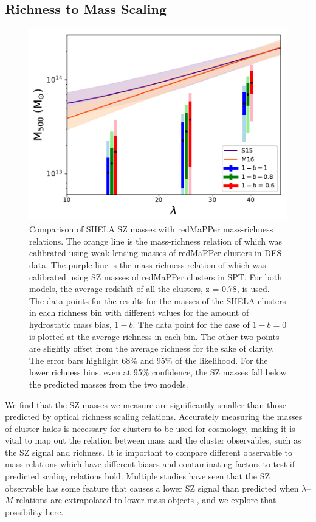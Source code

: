 \documentclass[a4paper,fleqn,usenatbib]{mnras}
\begin{document}
\subsection{Richness to Mass Scaling}
\begin{figure}
  \centering
    \includegraphics[width=\columnwidth] {M500_lambda_shela_sptvsrm.pdf}
  \caption{Comparison of SHELA SZ masses with redMaPPer mass-richness relations. The orange line is the mass-richness relation of \protect \cite{2016arXiv161006890M} which was calibrated using weak-lensing masses of redMaPPer clusters in DES data. The purple line is the mass-richness relation of \protect \cite{2015MNRAS.454.2305S} which was calibrated using SZ masses of redMaPPer clusters in SPT. For both models, the average redshift of all the clusters, z = 0.78, is used. The data points for the results for the masses of the SHELA clusters in each richness bin with different values for the amount of hydrostatic mass bias, $1-b$. The data point for the case of $1-b=0$ is plotted at the average richness in each bin. The other two points are slightly offset from the average richness for the sake of clarity. The error bars highlight 68\% and 95\% of the likelihood. For the lower richness bins, even at 95\% confidence, the SZ masses fall below the predicted masses from the two models.}
  \label{fig:y500vslambda}
\end{figure}


We find that the SZ masses we measure are significantly smaller than those predicted by optical richness scaling relations. Accurately measuring the masses of cluster halos is necessary for clusters to be used for cosmology, making it is vital to map out the relation between mass and the cluster observables, such as the SZ signal and richness. It is important to compare different observable to mass relations which have different biases and contaminating factors to test if predicted scaling relations hold. Multiple studies have seen that the SZ observable has some feature that causes a lower SZ signal than predicted when $\lambda$--$M$ relations are extrapolated to lower mass objects \citep{2011A&A...536A..12P,2012PhRvD..85b3005D,2013ApJ...767...38S,2016arXiv160508770S}, and we explore that possibility here.  
\end{document}
